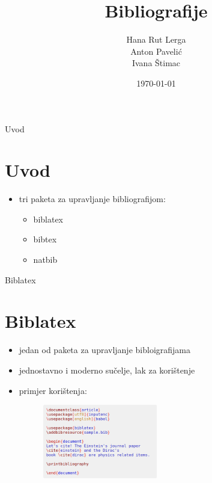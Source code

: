 \documentclass{beamer}
\begin{document}
\title{Bibliografije}
\date{\today}
\author{Hana Rut Lerga \\ Anton Pavelić \\ Ivana Štimac}

\begin{frame}
\maketitle
\end{frame}

\begin{frame}
\tableofcontents
\end{frame}


\begin{frame}{Uvod}
\section{Uvod}
\begin{itemize}
	\item tri paketa za upravljanje bibliografijom:\\
	\begin{itemize}
		\item biblatex \\
		\item bibtex \\
		\item natbib \\
	\end{itemize}
\end{itemize}
	
\end{frame}

\begin{frame}{Biblatex\cite{biblatex}}
\section{Biblatex}
\begin{itemize}
	\item jedan od paketa za upravljanje bibloigrafijama \\
	\item jednostavno i moderno sučelje, lak za korištenje \\
	\item primjer korištenja: \\
	\begin{figure}
	\includegraphics[width=5cm]{prviprimjer.png}
	\end{figure}
\end{itemize}
\end{frame}
\end{document}
